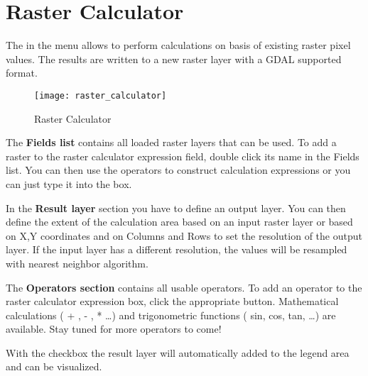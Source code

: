 \section{Raster Calculator}\label{sec:raster_calc}

The  in the  menu allows to 
perform calculations on basis of existing raster pixel values. The results 
are written to a new raster layer with a GDAL supported format. 

\begin{figure}[ht]
  \centering
    \texttt{[image: raster\_calculator]}
    \caption{Raster Calculator \nixcaption}\label{fig:raster_calculator}
\end{figure}

The \textbf{Fields list} contains all loaded raster layers that can be used. 
To add a raster to the raster calculator expression field, double
click its name in the Fields list. You can then use the operators to construct 
calculation expressions or you can just type it into the box.

In the \textbf{Result layer} section you have to define an output layer. You can 
then define the extent of the calculation area based on an input raster layer or 
based on X,Y coordinates and on Columns and Rows to set the resolution of the 
output layer. If the input layer has a different resolution, the values will be 
resampled with nearest neighbor algorithm.  

The \textbf{Operators section} contains all usable operators. To add an operator
to the raster calculator expression box, click the appropriate button. Mathematical
calculations ( + , - , * \dots) and trigonometric functions ( sin, cos, tan, \dots) 
are available. Stay tuned for more operators to come!

With the  checkbox the result layer will automatically 
added to the legend area and can be visualized. 

\FloatBarrier
